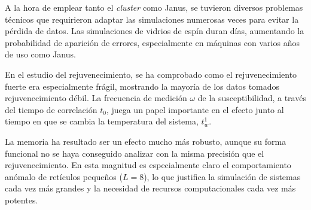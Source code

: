 \documentclass[11pt]{report}
\begin{document}
A la hora de emplear tanto el \textit{cluster} como Janus, se tuvieron
diversos problemas técnicos que requirieron adaptar las simulaciones
numerosas veces para evitar la pérdida de datos. Las simulaciones de
vidrios de espín duran días, aumentando la probabilidad de aparición
de errores, especialmente en máquinas con varios años de uso como
Janus.

En el estudio del rejuvenecimiento, se ha comprobado como el
rejuvenecimiento fuerte era especialmente frágil, mostrando la mayoría
de los datos tomados rejuvenecimiento débil. La frecuencia de medición
$ω$ de la susceptibilidad, a través del tiempo de correlación $t_0$,
juega un papel importante en el efecto junto al tiempo en que se
cambia la temperatura del sistema, $t_w^1$.

La memoria ha resultado ser un efecto mucho más robusto, aunque su
forma funcional no se haya conseguido analizar con la misma precisión
que el rejuvenecimiento. En esta magnitud es especialmente claro el
comportamiento anómalo de retículos pequeños ($L=8$), lo que justifica
la simulación de sistemas cada vez más grandes y la necesidad de
recursos computacionales cada vez más potentes.
\end{document}

